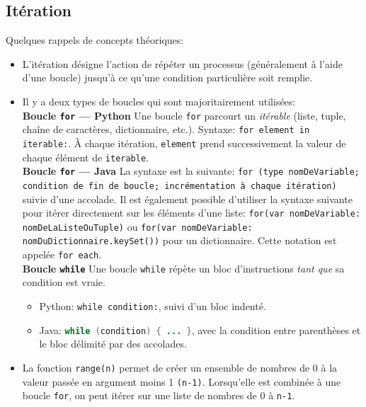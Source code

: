     \subsection{Itération}
    
    Quelques rappels de concepts théoriques: \\
    
    \begin{itemize}
    	\item L'itération désigne l'action de répéter un processus (généralement à l'aide d'une boucle) jusqu'à ce qu'une condition particulière soit remplie.
    	\item Il y a deux types de boucles qui sont majoritairement utilisées: \\
    	
    	\textbf{Boucle \texttt{for} — Python} Une boucle \lstinline{for} parcourt un \emph{itérable} (liste, tuple, chaîne de caractères, dictionnaire, etc.). Syntaxe: \lstinline{for element in iterable:}. À chaque itération, \texttt{element} prend successivement la valeur de chaque élément de \texttt{iterable}. \\
    	
             	
     	\textbf{Boucle \texttt{for} — Java} La syntaxe est la suivante: \lstinline{for (type nomDeVariable; condition de fin de boucle; incrémentation à chaque itération)} suivie d'une accolade. Il est également possible d'utiliser la syntaxe suivante pour itérer directement sur les éléments d'une liste: \lstinline{for(var nomDeVariable: nomDeLaListeOuTuple)} ou \lstinline{for(var nomDeVariable: nomDuDictionnaire.keySet())} pour un dictionnaire. Cette notation est appelée \texttt{for each}.\\
     	
        	 
        \textbf{Boucle \texttt{while}} Une boucle \lstinline{while} répète un bloc d'instructions \textit{tant que} sa condition est vraie. 
        \begin{itemize}
         \item Python: \lstinline{while condition:}, suivi d'un bloc indenté. 
         \item Java: \lstinline[language=Java]|while (condition) { ... }|, avec la condition entre parenthèses et le bloc délimité par des accolades.
        \end{itemize}
     	
     	
     	\item La fonction \lstinline{range(n)} permet de créer un ensemble de nombres de 0 à la valeur passée en argument moins 1 \texttt{(n-1)}. Lorsqu’elle est combinée à une boucle \lstinline{for}, on peut itérer sur une liste de nombres de 0 à \texttt{n-1}. \\
     	

\end{itemize}
